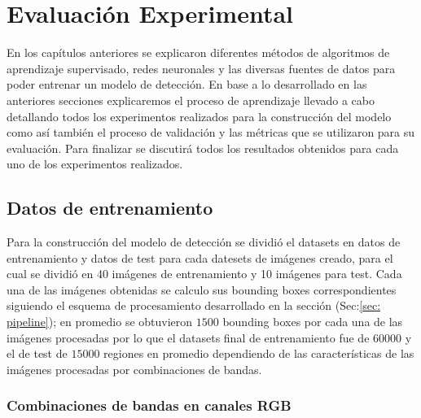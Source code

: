 \chapter{Evaluación Experimental}\label{chap:evaluacion}

En los capítulos anteriores se explicaron diferentes métodos de algoritmos de aprendizaje supervisado, redes neuronales y las diversas fuentes de datos para poder entrenar un modelo de detección. En  base a lo desarrollado en las anteriores secciones  explicaremos el proceso de aprendizaje llevado a cabo detallando todos los  experimentos realizados para la construcción del modelo como así también  el proceso de validación y las métricas que se utilizaron para su evaluación. Para finalizar se discutirá todos los resultados obtenidos para cada uno de los  experimentos realizados. 

\section{Datos de entrenamiento}\label{sec:datos_entrenamiento}

Para la construcción del modelo de detección se dividió el datasets en datos de entrenamiento y datos de test para cada datesets de imágenes creado,  para el cual se dividió en 40 imágenes de entrenamiento y 10 imágenes para test. Cada una de las imágenes obtenidas se calculo sus bounding boxes correspondientes  siguiendo el esquema de procesamiento desarrollado  en la sección (Sec:\ref{sec: pipeline}); en promedio se obtuvieron $1500$ bounding boxes por cada una de las imágenes procesadas por lo que el datasets final de entrenamiento fue de $60000$ y el de test de $15000$ regiones en promedio dependiendo de las características de las imágenes procesadas por combinaciones de bandas. 

\subsection{Combinaciones de bandas en canales RGB}\label{sub:comb_de_banda} 



